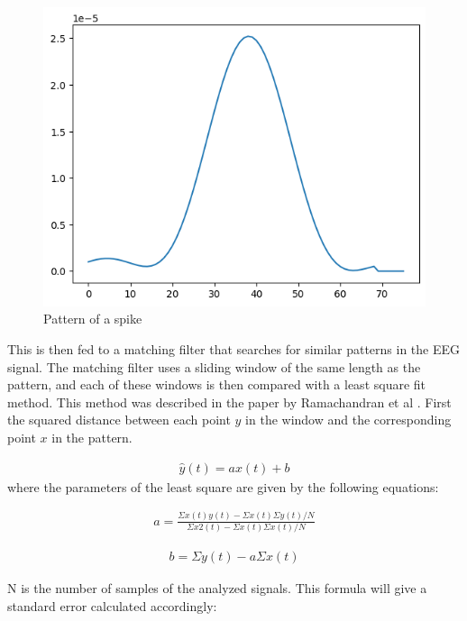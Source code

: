 \begin{figure}
    \centering
    \includegraphics[width=0.4\textheight]{images/Spike_pattern.png}
    \caption{Pattern of a spike}
    \label{fig:my_label1}
\end{figure}

This is then fed to a matching filter that searches for similar patterns in the EEG signal. The matching filter uses a sliding window of the same length as the pattern, and each of these windows is then compared with a least square fit method. This method was described in the paper by Ramachandran et al \cite{MatchingFilter2}. First the squared distance between each point $y$ in the window and the corresponding point $x$ in the pattern.

\begin{align}
    \hat{y}(t) = ax(t) + b
\end{align}
where the parameters of the least square are given by the following equations:

\begin{align}
    a = \frac{\Sigma x(t)y(t) - \Sigma x(t) \Sigma y(t)/N}{\Sigma x{2}(t) - \Sigma x(t) \Sigma x(t)/N}
\end{align}

\begin{align}
    b = \Sigma y(t) - a \Sigma x(t)   
\end{align}

N is the number of samples of the analyzed signals. This formula will give a standard error calculated accordingly:

